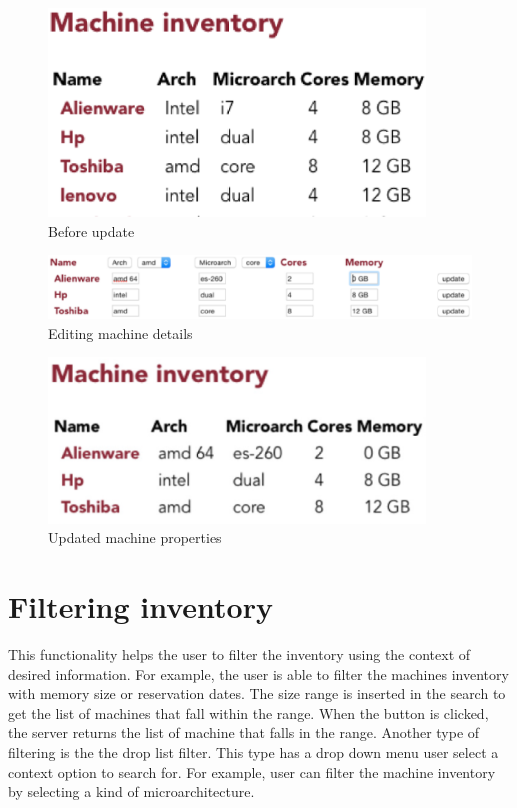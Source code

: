 \begin{figure}[h]
  \includegraphics[width=100mm, scale=0.5]{update.eps}
  \caption{Before update}
  \label{update}
\end{figure}
\begin{figure}[h]
  \includegraphics[width=\linewidth]{change.eps}
  \caption{Editing machine details}
   \label{change}
\end{figure}
\begin{figure}[h]
  \includegraphics[width=100mm, scale=0.5]{update2.eps}
  \caption{Updated machine properties}
  \label{update2}
\end{figure}

\pagebreak
\section*{Filtering inventory}
This functionality helps the user to filter the inventory using the context of desired information. For example, the user is able to filter the machines inventory with memory size or reservation dates. The size range is inserted in the search to get the list of machines that fall within the range. When the button is clicked, the  server returns the list of machine that falls in the range. Another type of filtering is the the drop list filter. This type has a drop down menu user select a context option to search for. For example, user can filter the machine inventory by selecting a kind of microarchitecture.
\pagebreak
\pagebreak
